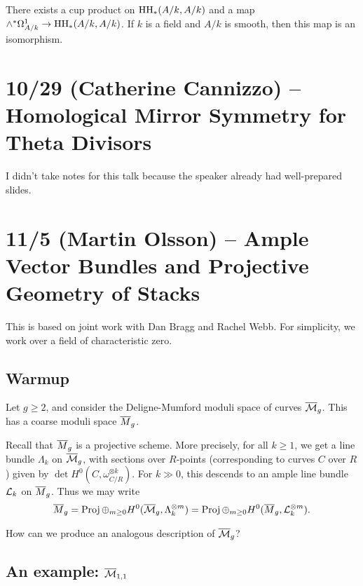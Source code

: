 \documentclass{amsart}
\begin{document}
\begin{thm}
	There exists a cup product on $\mathrm{HH}_*(A / k, A / k)$ and a map $\wedge^* \Omega^1_{A/k} \to \mathrm{HH}_*(A / k, A / k)$.
	If $k$ is a field and $A / k$ is smooth, then this map is an isomorphism.
\end{thm}

\section{10/29 (Catherine Cannizzo) -- Homological Mirror Symmetry for Theta Divisors}

I didn't take notes for this talk because the speaker already had well-prepared slides.

\section{11/5 (Martin Olsson) -- Ample Vector Bundles and Projective Geometry of Stacks}

This is based on joint work with Dan Bragg and Rachel Webb.
For simplicity, we work over a field of characteristic zero.

\subsection{Warmup}

Let $g \geq 2$, and consider the Deligne-Mumford moduli space of curves $\overline{\mathcal{M}}_g$.
This has a coarse moduli space $\overline{M}_g$.

Recall that $\overline{M}_g$ is a projective scheme.
More precisely, for all $k \geq 1$, we get a line bundle $\Lambda_k$ on $\overline{\mathcal{M}}_g$, with sections over $R$-points (corresponding to curves $C$ over $R$) given by $\det H^0(C, \omega_{C/R}^{\otimes k})$.
For $k \gg 0$, this descends to an ample line bundle $\mathcal{L}_k$ on $\overline{M}_g$.
Thus we may write 
\[
	\overline{M}_g = \operatorname{Proj} \oplus_{m \geq 0} H^0(\overline{\mathcal{M}}_g, \Lambda_k^{\otimes m}) = \operatorname{Proj} \oplus_{m \geq 0} H^0(\overline{M}_g, \mathcal{L}_k^{\otimes m}).
\]

\begin{qn}
	How can we produce an analogous description of $\overline{\mathcal{M}}_g$?
\end{qn}

\subsection{An example: $\overline{\mathcal{M}}_{1,1}$}
\end{document}
